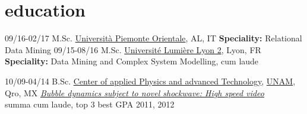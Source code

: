 \documentclass[]{friggeri-cv}
\begin{document}
\begin{entrylist}
%
\end{entrylist}

\section{education}

\begin{entrylist}
	\entry
	{09/16-02/17}
	{M.Sc. \href{http://www.em-dmkm.eu/}
		{}}
	{\href{http://www.uniupo.it/}{Università Piemonte Orientale}, AL, IT}
	{\textbf{Speciality:} Relational Data Mining
	}
	\entry
	{09/15-08/16}
	{M.Sc. \href{http://www.em-dmkm.eu/}
		{}}
	{\href{http://www.univ-lyon2.fr/}{Université Lumière Lyon 2}, Lyon, FR}
	{\textbf{Speciality:} Data Mining and Complex System Modelling, cum laude}
	
	\entry
	{10/09-04/14}
	{B.Sc. \href{http://www.fata.unam.mx/tecnologia}
		{}}
	{\href{http://www.fata.unam.mx/}{Center of applied Physics and advanced Technology}, \href{http://www.unam.mx/}{UNAM}, Qro, MX}           
	{\href{https://dl.dropboxusercontent.com/u/2115508/Tesis.pdf}{\emph{Bubble dynamics subject to novel shockwave: High speed video}}\\
		summa cum laude, top 3 best GPA 2011, 2012%
		}
\end{entrylist}
\end{document}
